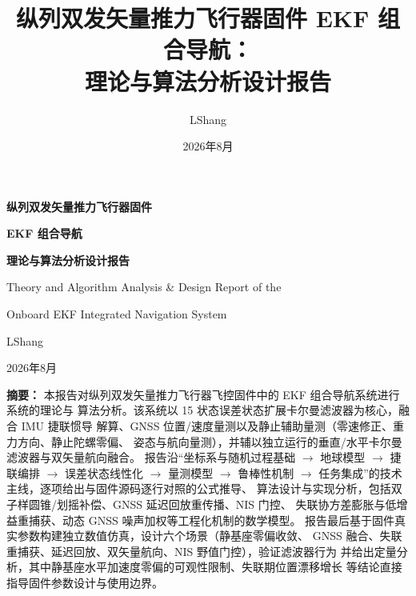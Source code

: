 

\title{\textbf{纵列双发矢量推力飞行器固件 EKF 组合导航：\\理论与算法分析设计报告}}
\author{LShang}
\date{2026年8月}



\begin{titlepage}
\centering
{\bfseries 纵列双发矢量推力飞行器固件\par}
\vspace{0.4em}
{\bfseries EKF 组合导航\par}
\vspace{1.0em}
{\bfseries 理论与算法分析设计报告\par}
\vspace{1.6em}
{\Large Theory and Algorithm Analysis \& Design Report of the\par}
\vspace{0.3em}
{\Large Onboard EKF Integrated Navigation System\par}
\vspace{2.2em}
{\large LShang\par}
\vspace{0.5em}
{\large 2026年8月\par}

\vfill
\begin{minipage}{0.94\textwidth}
\textbf{摘要：}
本报告对纵列双发矢量推力飞行器飞控固件中的 EKF 组合导航系统进行系统的理论与
算法分析。该系统以 15 状态误差状态扩展卡尔曼滤波器为核心，融合 IMU 捷联惯导
解算、GNSS 位置/速度量测以及静止辅助量测（零速修正、重力方向、静止陀螺零偏、
姿态与航向量测），并辅以独立运行的垂直/水平卡尔曼滤波器与双矢量航向融合。
报告沿``坐标系与随机过程基础 $\rightarrow$ 地球模型 $\rightarrow$ 捷联编排
$\rightarrow$ 误差状态线性化 $\rightarrow$ 量测模型 $\rightarrow$ 鲁棒性机制
$\rightarrow$ 任务集成''的技术主线，逐项给出与固件源码逐行对照的公式推导、
算法设计与实现分析，包括双子样圆锥/划摇补偿、GNSS 延迟回放重传播、NIS 门控、
失联协方差膨胀与低增益重捕获、动态 GNSS 噪声加权等工程化机制的数学模型。
报告最后基于固件真实参数构建独立数值仿真，设计六个场景（静基座零偏收敛、
GNSS 融合、失联重捕获、延迟回放、双矢量航向、NIS 野值门控），验证滤波器行为
并给出定量分析，其中静基座水平加速度零偏的可观性限制、失联期位置漂移增长
等结论直接指导固件参数设计与使用边界。


\end{minipage}
\end{titlepage}
